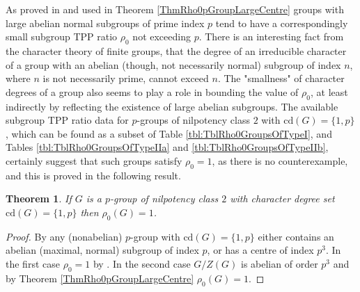 \documentclass{amsart}
\newtheorem{theorem}{Theorem}[section]
\theoremstyle{observation}
\theoremstyle{definition}
\theoremstyle{remark}
\numberwithin{equation}{section}
\begin{document}
As proved in \citep[Theorem 4.1, Corollary 4.3]{Mur} and used in Theorem \ref{ThmRho0pGroupLargeCentre} groups with large abelian normal subgroups of prime index $p$ tend to have a correspondingly small subgroup TPP ratio $\rho_0$ not exceeding $p$. There is an interesting fact from the character theory of finite groups, that the degree of an irreducible character of a group with an abelian (though, not necessarily normal) subgroup of index $n$, where $n$ is not necessarily prime, cannot exceed $n$. The "smallness" of character degrees of a group also seems to play a role in bounding the value of $\rho_0$, at least indirectly by reflecting the existence of large abelian subgroups. The available subgroup TPP ratio data for $p$-groups of nilpotency class $2$ with $\text{cd}(G) = \{1, p\}$, which can be found as a subset of Table \ref{tbl:TblRho0GroupsOfTypeI}, and Tables \ref{tbl:TblRho0GroupsOfTypeIIa} and \ref{tbl:TblRho0GroupsOfTypeIIb}, certainly suggest that such groups satisfy $\rho_0 = 1$, as there is no counterexample, and this is proved in the following result.

\begin{theorem} If $G$ is a $p$-group of nilpotency class $2$ with character degree set $\text{cd}(G) = \{1, p\}$ then $\rho_0(G) = 1$.
\end{theorem}
\begin{proof}By \citep[Theorem C 4.8]{IP} any (nonabelian) $p$-group with $\text{cd}(G) = \{1, p\}$ either contains an abelian (maximal, normal) subgroup of index $p$, or has a centre of index $p^3$. In the first case $\rho_0 = 1$ by \citep[Corollary 4.3]{Mur}. In the second case $G/Z(G)$ is abelian of order $p^3$ and by Theorem \ref{ThmRho0pGroupLargeCentre} $\rho_0(G) = 1$.
\end{proof}
\end{document}
